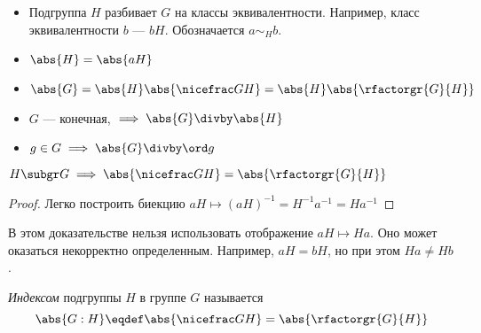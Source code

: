 \begin{corollary}
  \theoremlistshack
  \begin{itemize}
    \item Подгруппа $H$ разбивает $G$ на классы эквивалентности. Например, класс эквивалентности $b$ --- $bH$. Обозначается $a\sim_Hb$.
    \item $\abs{H}=\abs{aH}$
    \item $\abs{G}=\abs{H}\abs{\factorgr{G}{H}}=\abs{H}\abs{\rfactorgr{G}{H}}$
    \item $G$ --- конечная, $\implies \abs{G}\divby\abs{H}$
    \item $g\in G \implies \abs{G}\divby\ord g$
  \end{itemize}
\end{corollary}
\begin{corollary}

\end{corollary}
\begin{theorem}
  $H\subgr G \implies \abs{\factorgr{G}{H}}=\abs{\rfactorgr{G}{H}}$
\end{theorem}
\begin{proof}
  Легко построить биекцию $aH \mapsto (aH)^{-1}=H^{-1} a^{-1}=Ha^{-1}$
\end{proof}
\begin{remark}
  В этом доказательстве нельзя использовать отображение $aH \mapsto Ha$. Оно может оказаться некорректно определенным. Например, $aH=bH$, но при этом $Ha\neq Hb$.
\end{remark}
\begin{definition}
  \emph{Индексом} подгруппы $H$ в группе $G$ называется \[\abs{G:H}\eqdef\abs{\factorgr{G}{H}}=\abs{\rfactorgr{G}{H}}\]
\end{definition}

